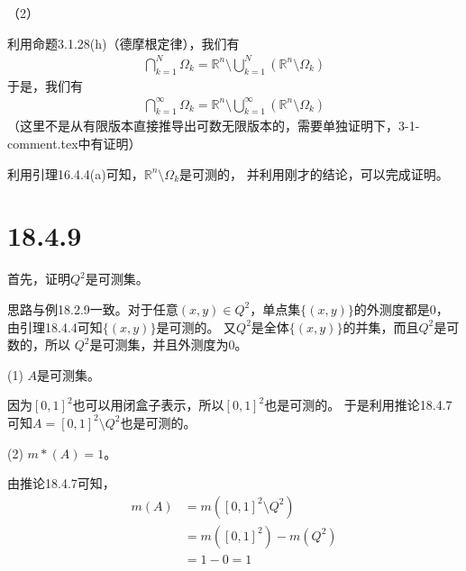 \documentclass{article}
\begin{document}
（2）

利用命题3.1.28(h)（德摩根定律），我们有
\begin{align*}
  \bigcap\limits_{k = 1}^N \Omega_{k} = \mathbb{R}^n \setminus \bigcup\limits_{k = 1}^N (\mathbb{R}^n \setminus \Omega_{k})
\end{align*}
于是，我们有
\begin{align*}
  \bigcap\limits_{k = 1}^\infty \Omega_{k} = \mathbb{R}^n \setminus \bigcup\limits_{k = 1}^\infty (\mathbb{R}^n \setminus \Omega_{k})
\end{align*}
（这里不是从有限版本直接推导出可数无限版本的，需要单独证明下，3-1-comment.tex中有证明）

利用引理16.4.4(a)可知，$\mathbb{R}^n \setminus \Omega_{k}$是可测的，
并利用刚才的结论，可以完成证明。

\section*{18.4.9}
首先，证明$Q^2$是可测集。

思路与例18.2.9一致。对于任意$(x, y) \in Q^2$，单点集$\{(x, y)\}$的外测度都是$0$，
由引理18.4.4可知$\{(x, y)\}$是可测的。
又$Q^2$是全体$\{(x, y)\}$的并集，而且$Q^2$是可数的，所以
$Q^2$是可测集，并且外测度为$0$。


(1) $A$是可测集。

因为$[0,1]^2$也可以用闭盒子表示，所以$[0, 1]^2$也是可测的。
于是利用推论18.4.7可知$A = [0, 1]^2 \setminus Q^2$也是可测的。

(2) $m*(A) = 1$。

由推论18.4.7可知，
\begin{align*}
  m(A) & = m([0, 1]^2 \setminus Q^2) \\
       & = m([0, 1]^2) - m(Q^2)      \\
       & = 1 - 0 = 1
\end{align*}
\end{document}
